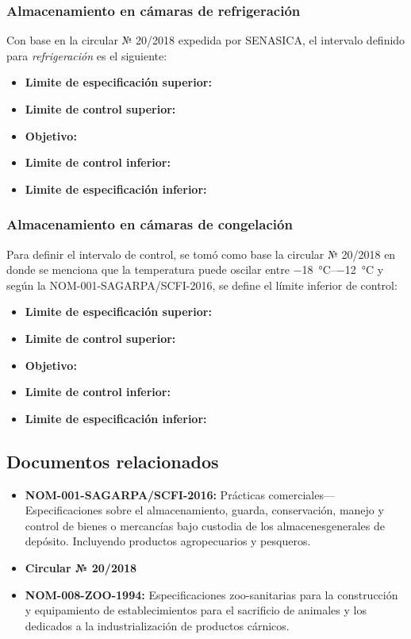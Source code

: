 \subsubsection{Almacenamiento en cámaras de refrigeración}

Con base en la circular № 20/2018 expedida por \Gls{SENASICA}, el intervalo definido para \emph{refrigeración} es el siguiente:

\begin{itemize}
	\item \textbf{Limite de especificación superior:} 
	\item \textbf{Limite de control superior:} 
	\item \textbf{Objetivo:} 
	\item \textbf{Limite de control inferior:} 
	\item \textbf{Limite de especificación inferior:} 
\end{itemize}

\subsubsection{Almacenamiento en cámaras de congelación}

Para definir el intervalo de control, se tomó como base la circular № 20/2018  en donde se menciona que la temperatura puede oscilar entre \qtyrange{-18}{-12}{\celsius} y según la NOM-001-SAGARPA/SCFI-2016, se define el límite inferior de control:

\begin{itemize}
	\item \textbf{Limite de especificación superior:} 
	\item \textbf{Limite de control superior:} 
	\item \textbf{Objetivo:} 
	\item \textbf{Limite de control inferior:} 
	\item \textbf{Limite de especificación inferior:} 
\end{itemize}

\subsection{Documentos relacionados}

\begin{itemize}
	\item \textbf{NOM-001-SAGARPA/SCFI-2016:} Prácticas comerciales—Especificaciones sobre el almacenamiento, guarda, conservación, manejo y control de bienes o mercancías bajo custodia de los almacenesgenerales de depósito. Incluyendo productos agropecuarios y pesqueros.
	\item \textbf{Circular № 20/2018 }
	\item \textbf{NOM-008-ZOO-1994:} Especificaciones zoo-sanitarias para la construcción y equipamiento de establecimientos para el sacrificio de animales y los dedicados a la industrialización de productos cárnicos.
\end{itemize}

